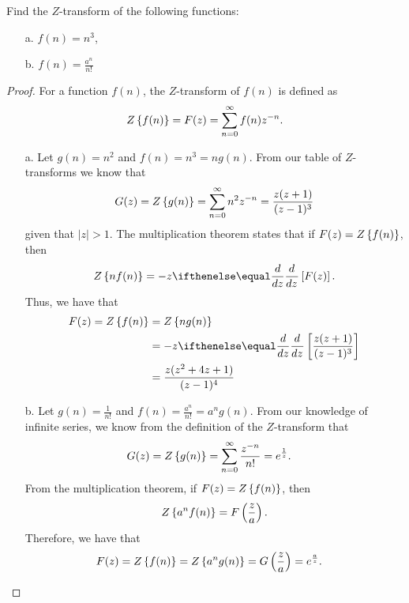 \begin{problem}{12.1}
  Find the $Z$-transform of the following functions:
  \begin{enumerate}
    \item[a.] $f(n) = n^3$,
    \item[b.] $\displaystyle f(n) = \frac{a^n}{n!}$
  \end{enumerate}
\end{problem}

\begin{proof}
  For a function $f(n)$, the $Z$-transform of $f(n)$ is defined as
  \begin{align*}
    Z\left\{ {f(n)} \right\} = F(z) = \sum_{n=0}^\infty f(n) z^{-n}.
  \end{align*}
  \begin{enumerate}
    \item[a.] Let $g(n) = n^2$ and $f(n) = n^3 = n g(n)$.
      From our table of $Z$-transforms we know that
      \begin{align*}
        G(z) = Z\left\{ {g(n)} \right\} = \sum_{n=0}^{\infty} n^2 z^{-n} = \frac{z(z+1)}{(z-1)^3}
      \end{align*}
      given that $|z| > 1$.
      The multiplication theorem states that if $F(z) = Z\left\{ {f(n)} \right\}$, then
      \begin{align*}
        \Z{n f(n)} = -z \der{z}{}\left[F(z)\right].
      \end{align*}
      Thus, we have that
      \begin{align*}
        F(z) = \Z{f(n)} &= \Z{n g(n)} \\
        &= -z \der{z}{}\left[\frac{z(z+1)}{(z-1)^3}\right] \\
        &= \frac{z(z^2 + 4z + 1)}{(z-1)^4}
      \end{align*}

    \item[b.] Let $g(n) = \frac{1}{n!}$ and $f(n) = \frac{a^n}{n!} = a^n g(n)$.
      From our knowledge of infinite series, we know from the definition of the $Z$-transform that
      \begin{align*}
        G(z) = Z\left\{ {g(n)} \right\} &= \sum_{n=0}^\infty \frac{z^{-n}}{n!} = e^{\frac{1}{z}}.
      \end{align*}
      From the multiplication theorem, if $F(z) = Z\left\{ {f(n)} \right\}$, then
      \begin{align*}
        Z\left\{ {a^n f(n)} \right\} = F\left(\frac{z}{a}\right).
      \end{align*}
      Therefore, we have that
      \begin{align*}
        F(z) = Z\left\{ {f(n)} \right\} = Z\left\{ {a^ng(n)} \right\} &= G\left(\frac{z}{a}\right) = e^{\frac{a}{z}}.
      \end{align*}
  \end{enumerate}
\end{proof}
\newpage
